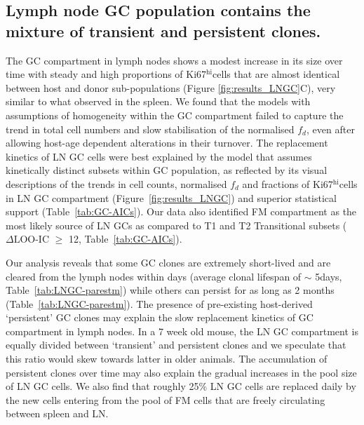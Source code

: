 \documentclass[11pt,onecolumn]{article}
\newcommand{\khi}{Ki67$^\text{hi}$}
\newcommand{\looic}{\ensuremath{\Delta \text{LOO-IC}}}
\begin{document}
\subsection*{Lymph node GC population contains the mixture of transient and persistent clones.}
The GC compartment in lymph nodes shows a modest increase in its size over time with steady and high proportions of \khi cells that are almost identical between host and donor sub-populations (Figure \ref{fig:results_LNGC}C), very similar to what observed in the spleen.
We found that the models with assumptions of homogeneity within the GC compartment failed to capture the trend in total cell numbers and slow stabilisation of the normalised $f_{d}$, even after allowing host-age dependent alterations in their turnover. 
The replacement kinetics of LN GC cells were best explained by the model that assumes kinetically distinct subsets within GC population, as reflected by its visual descriptions of the trends in cell counts, normalised $f_{d}$ and fractions of \khi cells in LN GC compartment (Figure~\ref{fig:results_LNGC}) and superior statistical support (Table~\ref{tab:GC-AICs}). 
Our data also identified FM compartment as the most likely source of LN GCs as compared to T1 and T2 Transitional subsets ({\looic} $\ge$ 12, Table~\ref{tab:GC-AICs}).

Our analysis reveals that some GC clones are extremely short-lived and are cleared from the lymph nodes within days (average clonal lifespan of $\sim$ 5days, Table~\ref{tab:LNGC-parestm}) while others can persist for as long as 2 months (Table~\ref{tab:LNGC-parestm}).
The presence of pre-existing host-derived `persistent' GC clones  may explain the slow replacement kinetics of GC compartment in lymph nodes.
In a 7 week old mouse, the LN GC compartment is equally divided between `transient' and persistent clones and we speculate that this ratio would skew towards latter in older animals.
The accumulation of persistent clones over time may also explain the gradual increases in the pool size of LN GC cells.
We also find that roughly 25\% LN GC cells are replaced daily by the new cells entering from the pool of FM cells that are freely circulating between spleen and LN.
\end{document}
